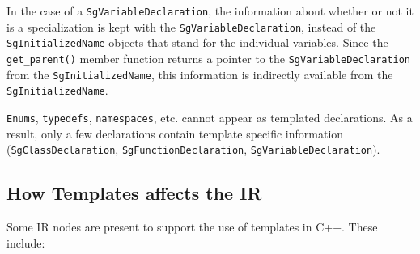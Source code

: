    In the case of a {\tt SgVariableDeclaration}, the information about whether or not it is a specialization
is kept with the {\tt SgVariableDeclaration}, instead of the {\tt SgInitializedName} objects that
stand for the individual variables.  Since the {\tt get\_parent()} member function returns
a pointer to the {\tt SgVariableDeclaration} from the {\tt SgInitializedName}, this
information is indirectly available from the {\tt SgInitializedName}.

  {\tt Enums}, {\tt typedefs}, {\tt namespaces}, etc. cannot appear as templated declarations.
As a result, only a few declarations contain template specific information
({\tt SgClassDeclaration}, {\tt SgFunctionDeclaration}, {\tt SgVariableDeclaration}).

\subsection{ How Templates affects the IR }
   Some IR nodes are present to support the use of templates in C++. These include:

